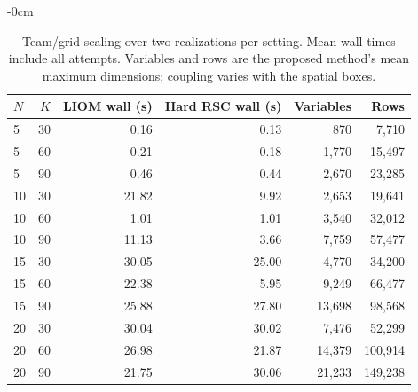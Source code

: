 \begin{table}[htbp]
\begin{adjustwidth}{-\extralength}{0cm}
\caption{Team/grid scaling over two realizations per setting. Mean wall times include all attempts. Variables and rows are the proposed method's mean maximum dimensions; coupling varies with the spatial boxes.\label{tab:scaling-new}}
\centering\small
\begin{tabular}{lrrrrr}\toprule
$N$ & $K$ & LIOM wall (s) & Hard RSC wall (s) & Variables & Rows\\\midrule
5 & 30 & 0.16 & 0.13 & 870 & 7,710\\
5 & 60 & 0.21 & 0.18 & 1,770 & 15,497\\
5 & 90 & 0.46 & 0.44 & 2,670 & 23,285\\
10 & 30 & 21.82 & 9.92 & 2,653 & 19,641\\
10 & 60 & 1.01 & 1.01 & 3,540 & 32,012\\
10 & 90 & 11.13 & 3.66 & 7,759 & 57,477\\
15 & 30 & 30.05 & 25.00 & 4,770 & 34,200\\
15 & 60 & 22.38 & 5.95 & 9,249 & 66,477\\
15 & 90 & 25.88 & 27.80 & 13,698 & 98,568\\
20 & 30 & 30.04 & 30.02 & 7,476 & 52,299\\
20 & 60 & 26.98 & 21.87 & 14,379 & 100,914\\
20 & 90 & 21.75 & 30.06 & 21,233 & 149,238\\
\bottomrule\end{tabular}
\end{adjustwidth}
\end{table}

